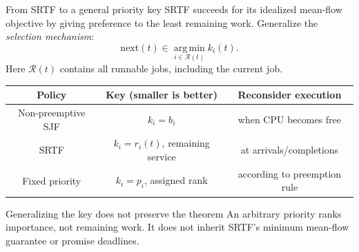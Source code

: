 \documentclass[aspectratio=169,11pt]{beamer}
\begin{document}
\begin{frame}{From SRTF to a general priority key}
  \small SRTF succeeds for its idealized mean-flow objective by giving preference to the least remaining work. Generalize the \emph{selection mechanism}:
  \[
    \text{next}(t)\in\operatorname*{arg\,min}_{i\in\mathcal{R}(t)} k_i(t).
  \]
  Here $\mathcal{R}(t)$ contains all runnable jobs, including the current job.
  \par\medskip
  \renewcommand{\arraystretch}{1.2}
  \begin{tabularx}{\textwidth}{@{}CCC@{}}
    \toprule
    \textbf{Policy} & \textbf{Key (smaller is better)} & \textbf{Reconsider execution} \\
    \midrule
    Non-preemptive SJF & $k_i=b_i$ & when CPU becomes free \\
    SRTF & $k_i=r_i(t)$, remaining service & at arrivals/completions \\
    Fixed priority & $k_i=p_i$, assigned rank & according to preemption rule \\
    \bottomrule
  \end{tabularx}
  \begin{alertblock}{Generalizing the key does not preserve the theorem}
    An arbitrary priority ranks importance, not remaining work. It does not inherit SRTF's minimum mean-flow guarantee or promise deadlines.
  \end{alertblock}
\end{frame}
\end{document}
